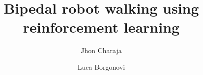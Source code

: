 \documentclass[review]{elsarticle}
\begin{document}
\begin{frontmatter}
\title{Bipedal robot walking using reinforcement learning}
\author{Jhon Charaja}
\author{Luca Borgonovi}

\end{frontmatter}







	
\end{document}
